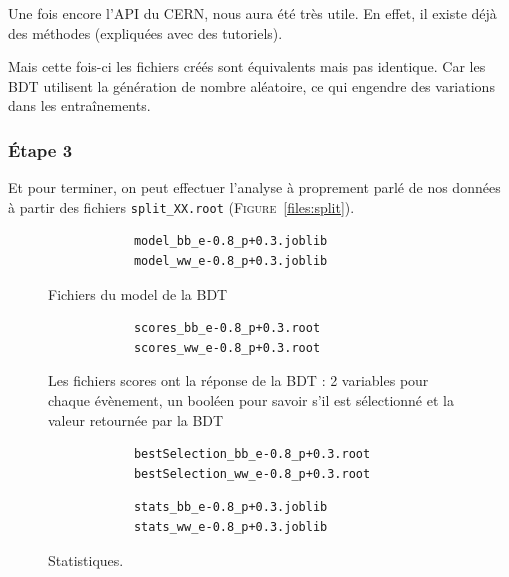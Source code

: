 \documentclass[10pt,a4paper]{report}
\newcommand{\ROOT}{\texttt{ROOT}\xspace}
\newcommand{\bbar}{\overline{b}}
\newcommand{\Wstar}{W^{\star}}
\newcommand{\nnh}{\nu \nu h}
\begin{document}
Une fois encore l'API du CERN, nous aura été très utile. En effet, il existe déjà des méthodes (expliquées avec des tutoriels). 

Mais cette fois-ci les fichiers créés sont équivalents mais pas identique. Car les BDT utilisent la génération de nombre aléatoire, ce qui engendre des variations dans les entraînements.\\

\subsubsection{Étape 3}

Et pour terminer, on peut effectuer l'analyse à proprement parlé de nos données à partir des fichiers \texttt{split\_XX.root} (\textsc{Figure}~\ref{files:split}).

\begin{figure}[h!]
	\centering
	\begin{lstlisting}
			model_bb_e-0.8_p+0.3.joblib
			model_ww_e-0.8_p+0.3.joblib
	\end{lstlisting}
	\caption{Fichiers du model de la BDT}
	\label{files:model}
\end{figure}
	
\begin{figure}[h!]
	\centering
	\begin{lstlisting}
			scores_bb_e-0.8_p+0.3.root
			scores_ww_e-0.8_p+0.3.root
	\end{lstlisting}
	\caption{Les fichiers scores ont la réponse de la BDT : 2 variables pour chaque évènement, un booléen pour savoir s'il est sélectionné et la valeur retournée par la BDT}
	\label{files:scores}
\end{figure}
	
\begin{figure}[h!]
	\centering
	\begin{lstlisting}
			bestSelection_bb_e-0.8_p+0.3.root
			bestSelection_ww_e-0.8_p+0.3.root
	\end{lstlisting}
	\caption{
	}
	\label{files:bestSelection}
\end{figure}
	
\begin{figure}[h!]
	\centering
	\begin{lstlisting}
			stats_bb_e-0.8_p+0.3.joblib
			stats_ww_e-0.8_p+0.3.joblib
	\end{lstlisting}
	\caption{Statistiques.}
	\label{files:stats}
\end{figure}
\end{document}
